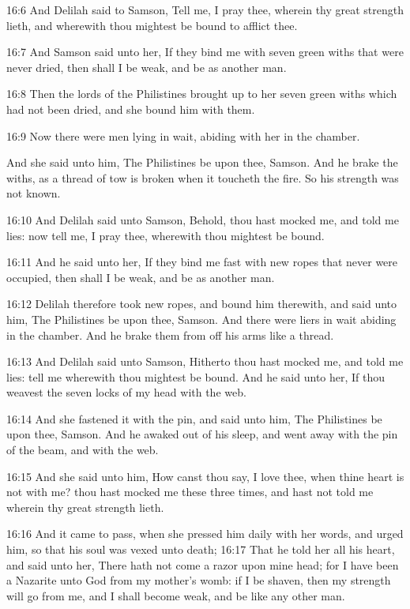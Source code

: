 16:6 And Delilah said to Samson, Tell me, I pray thee, wherein thy great strength lieth, and wherewith thou mightest be bound to afflict thee.

16:7 And Samson said unto her, If they bind me with seven green withs that were never dried, then shall I be weak, and be as another man.

16:8 Then the lords of the Philistines brought up to her seven green withs which had not been dried, and she bound him with them.

16:9 Now there were men lying in wait, abiding with her in the chamber.

And she said unto him, The Philistines be upon thee, Samson. And he brake the withs, as a thread of tow is broken when it toucheth the fire. So his strength was not known.

16:10 And Delilah said unto Samson, Behold, thou hast mocked me, and told me lies: now tell me, I pray thee, wherewith thou mightest be bound.

16:11 And he said unto her, If they bind me fast with new ropes that never were occupied, then shall I be weak, and be as another man.

16:12 Delilah therefore took new ropes, and bound him therewith, and said unto him, The Philistines be upon thee, Samson. And there were liers in wait abiding in the chamber. And he brake them from off his arms like a thread.

16:13 And Delilah said unto Samson, Hitherto thou hast mocked me, and told me lies: tell me wherewith thou mightest be bound. And he said unto her, If thou weavest the seven locks of my head with the web.

16:14 And she fastened it with the pin, and said unto him, The Philistines be upon thee, Samson. And he awaked out of his sleep, and went away with the pin of the beam, and with the web.

16:15 And she said unto him, How canst thou say, I love thee, when thine heart is not with me? thou hast mocked me these three times, and hast not told me wherein thy great strength lieth.

16:16 And it came to pass, when she pressed him daily with her words, and urged him, so that his soul was vexed unto death; 16:17 That he told her all his heart, and said unto her, There hath not come a razor upon mine head; for I have been a Nazarite unto God from my mother's womb: if I be shaven, then my strength will go from me, and I shall become weak, and be like any other man.

